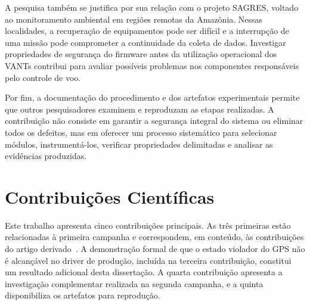 A pesquisa também se justifica por sua relação com o projeto SAGRES, voltado ao monitoramento ambiental em regiões remotas da Amazônia. Nessas localidades, a recuperação de equipamentos pode ser difícil e a interrupção de uma missão pode comprometer a continuidade da coleta de dados. Investigar propriedades de segurança do firmware antes da utilização operacional dos VANTs contribui para avaliar possíveis problemas nos componentes responsáveis pelo controle de voo.

Por fim, a documentação do procedimento e dos artefatos experimentais permite que outros pesquisadores examinem e reproduzam as etapas realizadas. A contribuição não consiste em garantir a segurança integral do sistema ou eliminar todos os defeitos, mas em oferecer um processo sistemático para selecionar módulos, instrumentá-los, verificar propriedades delimitadas e analisar as evidências produzidas.

\section{Contribuições Científicas}
\label{sec:contribuicoes}

Este trabalho apresenta cinco contribuições principais. As três primeiras estão relacionadas à primeira campanha e correspondem, em conteúdo, às contribuições do artigo derivado~\cite{Rodrigues2026}. A demonstração formal de que o estado violador do GPS não é alcançável no driver de produção, incluída na terceira contribuição, constitui um resultado adicional desta dissertação. A quarta contribuição apresenta a investigação complementar realizada na segunda campanha, e a quinta disponibiliza os artefatos para reprodução.

